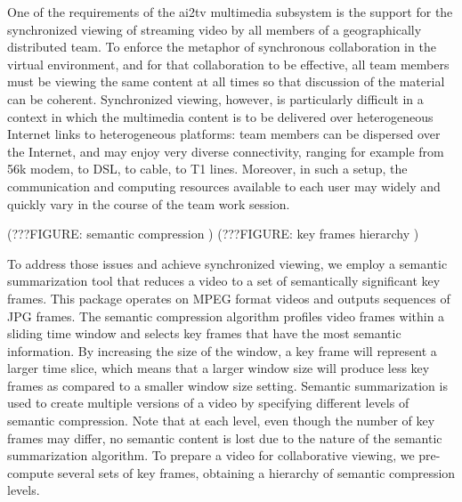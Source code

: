 \documentclass{sig-alternate}
\begin{document}


One of the requirements of the ai2tv multimedia subsystem
is the support for the synchronized viewing of streaming video by all
members of a geographically distributed team. To enforce the metaphor
of synchronous collaboration in the virtual environment, and for that
collaboration to be effective, all team members must be viewing the
same content at all times so that discussion of the material can be
coherent.  Synchronized viewing, however, is particularly difficult in
a context in which the multimedia content is to be delivered over
heterogeneous Internet links to heterogeneous platforms: team members
can be dispersed over the Internet, and may enjoy very diverse
connectivity, ranging for example from 56k modem, to DSL, to cable, to
T1 lines.  Moreover, in such a setup, the communication and computing
resources available to each user may widely and quickly vary in the
course of the team work session.

(???FIGURE: semantic compression )
(???FIGURE: key frames hierarchy )


To address those issues and achieve synchronized viewing, we employ a
semantic summarization tool \cite{TIECHENG} that reduces a video to a
set of semantically significant key frames.  This package operates on
MPEG format videos and outputs sequences of JPG frames.  The semantic
compression algorithm profiles video frames within a sliding time
window and selects key frames that have the most semantic information.
By increasing the size of the window, a key frame will represent a
larger time slice, which means that a larger window size will produce
less key frames as compared to a smaller window size setting.
Semantic summarization is used to create multiple versions of a video
by specifying different levels of semantic compression.  Note that at
each level, even though the number of key frames may differ, no
semantic content is lost due to the nature of the semantic
summarization algorithm.  To prepare a video for collaborative
viewing, we pre-compute several sets of key frames, obtaining a
hierarchy of semantic compression levels.
\end{document}
